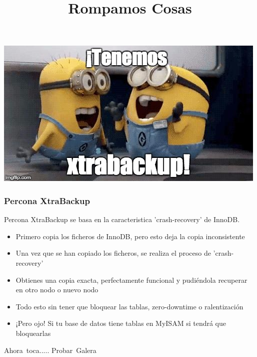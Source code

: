 \documentclass[UTF8]{beamer}
\begin{document}
\begin{frame}
	\includegraphics[width=\textwidth,height=\textheight,keepaspectratio]{tenemos_xtrabackup}	
	
\end{frame}


\begin{frame}
	\frametitle{Percona XtraBackup}
	Percona XtraBackup se basa en la caracteristica 'crash-recovery' de InnoDB.
	\pause
	\begin{itemize}
		\item Primero copia los ficheros de InnoDB, pero esto deja la copia inconsistente
		\pause
		\item Una vez que se han copiado los ficheros, se realiza el proceso de 'crash-recovery'
		\pause
		\item Obtienes una copia exacta, perfectamente funcional y pudiéndola recuperar en otro nodo o nuevo nodo
		\pause
		\item Todo esto sin tener que bloquear las tablas, zero-downtime o ralentización
		\pause
		\item ¡Pero ojo! Si tu base de datos tiene tablas en MyISAM si tendrá que bloquearlas
	\end{itemize}
\end{frame}



\title[Rompamos Cosas]{Rompamos Cosas}

\begin{frame}
	\centering
	\mbox{Ahora toca.....}
	\pause
	\mbox{Probar Galera}	
\end{frame}
	
	
\end{document}
